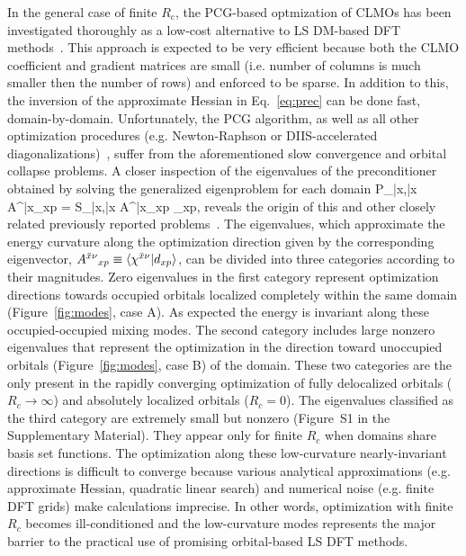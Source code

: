\documentclass[aps,prl,twocolumn,reprint,amsmath,amssymb]{revtex4-1}
\begin{document}
In the general case of finite $R_c$, the PCG-based optmization of CLMOs has been investigated thoroughly as a low-cost alternative to LS DM-based DFT methods~\cite{mauri1993orbital, kim1995total, ordejon1995linear, fattebert2004linear, fattebert2006linear, burger2008linear, peng2013effective, khaliullin2013efficient}. 
This approach is expected to be very efficient because both the CLMO coefficient and gradient matrices are small (i.e. number of columns is much smaller then the number of rows) and enforced to be sparse. 
In addition to this, the inversion of the approximate Hessian in Eq.~\ref{eq:prec} can be done fast, domain-by-domain. 
%
Unfortunately, the PCG algorithm, as well as all other optimization procedures (e.g. Newton-Raphson or DIIS-accelerated diagonalizations)~\cite{stoll1980use}, suffer from the aforementioned slow convergence and orbital collapse problems. 
%
A closer inspection of the eigenvalues of the preconditioner obtained by solving the generalized eigenproblem for each domain 
%
\bea
P_{\bar{x}\mu,\bar{x}\nu} {A^{\bar{x}\nu}}_{xp} =  S_{\bar{x}\mu,\bar{x}\lambda} {A^{\bar{x}\lambda}}_{xp} \Lambda_{xp},
\label{eq:gev}
\eea
%
reveals the origin of this and other closely related previously reported problems~\cite{goedecker1999linear}. 
The eigenvalues, which approximate the energy curvature along the optimization direction  given by the corresponding eigenvector, ${A^{\bar{x}\nu}}_{xp} \equiv \langle \chi^{\bar{x}\nu} \vert d_{xp} \rangle$, can be divided into three categories according to their magnitudes. 
Zero eigenvalues in the first category represent optimization directions towards occupied orbitals localized completely within the same domain (Figure~\ref{fig:modes}, case A). 
As expected the energy is invariant along these occupied-occupied mixing modes. 
The second category includes large nonzero eigenvalues that represent the optimization in the direction toward unoccupied orbitals (Figure~\ref{fig:modes}, case B) of the domain. 
These two categories are the only present in the rapidly converging optimization of fully delocalized orbitals ($R_c \rightarrow \infty$) and absolutely localized orbitals ($R_c = 0$). 
The eigenvalues classified as the third category are extremely small but nonzero (Figure~S1 in the Supplementary Material). 
They appear only for finite $R_c$ when domains share basis set functions. 
The optimization along these low-curvature nearly-invariant directions is difficult to converge because various analytical approximations (e.g. approximate Hessian, quadratic linear search) and numerical noise (e.g. finite DFT grids) make calculations  imprecise. 
In other words, optimization with finite $R_c$ becomes ill-conditioned and the low-curvature modes represents the major barrier to the practical use of promising orbital-based LS DFT methods. 
\end{document}
